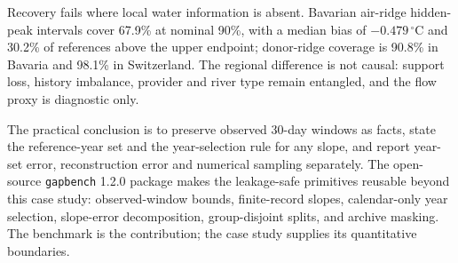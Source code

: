 Recovery fails where local water information is absent. Bavarian air-ridge hidden-peak intervals cover 67.9\% at nominal 90\%, with a median bias of $-0.479$\,$^{\circ}$C and 30.2\% of references above the upper endpoint; donor-ridge coverage is 90.8\% in Bavaria and 98.1\% in Switzerland. The regional difference is not causal: support loss, history imbalance, provider and river type remain entangled, and the flow proxy is diagnostic only.

The practical conclusion is to preserve observed 30-day windows as facts, state the reference-year set and the year-selection rule for any slope, and report year-set error, reconstruction error and numerical sampling separately. The open-source \texttt{gapbench} 1.2.0 package makes the leakage-safe primitives reusable beyond this case study: observed-window bounds, finite-record slopes, calendar-only year selection, slope-error decomposition, group-disjoint splits, and archive masking. The benchmark is the contribution; the case study supplies its quantitative boundaries.
